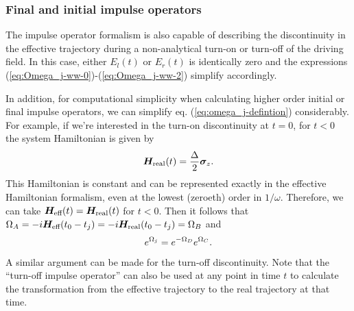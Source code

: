 \subsubsection{Final and initial impulse operators}
The impulse operator formalism is also capable of describing the discontinuity in the effective trajectory during a non-analytical turn-on or turn-off of the driving field. In this case, either $E_l(t)$ or $E_r(t)$ is identically zero and the expressions (\ref{eq:Omega_j-ww-0})-(\ref{eq:Omega_j-ww-2}) simplify accordingly. 

In addition, for computational simplicity when calculating higher order initial or final impulse operators, we can simplify eq. (\ref{eq:omega_j-defintion}) considerably. For example, if we're interested in the turn-on discontinuity at $t=0$, for $t<0$ the system Hamiltonian is given by 
\begin{align}
	\label{eq:H-nodrive}
	\bm{H}_{\text{real}}(t) = \frac{\Delta}{2}\bm{\sigma}_z.
\end{align}
This Hamiltonian is constant and can be represented exactly in the effective Hamiltonian formalism, even at the lowest (zeroeth) order in $1/\omega$. Therefore, we can take $\bm{H}_{\text{eff}}(t) = \bm{H}_{\text{real}}(t)$ for $t<0$. Then it follows that $\Omega_A = -i\bm{H}_{\text{eff}} (t_0 - t_j) = -i\bm{H}_{\text{real}} (t_0 - t_j) = \Omega_B$ and
\begin{align}
	e^{\Omega_j} = e^{-\Omega_D}e^{\Omega_C}.
\end{align}
A similar argument can be made for the turn-off discontinuity. Note that the ``turn-off impulse operator'' can also be used at any point in time $t$ to calculate the transformation from the effective trajectory to the real trajectory at that time.


\newpage 

